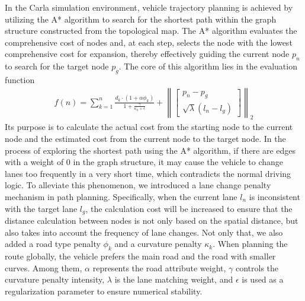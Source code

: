 \documentclass[lettersize,journal]{IEEEtran}
\begin{document}
In the Carla simulation environment, vehicle trajectory planning is achieved by utilizing the A* algorithm to search for the shortest path within the graph structure constructed from the topological map. 
The A* algorithm evaluates the comprehensive cost of nodes and, at each step, selects the node with the lowest comprehensive cost for expansion, thereby effectively guiding the current node \(p_{n}\) to search for the target node \(p_{g}\).
The core of this algorithm lies in the evaluation function 
\begin{align}
	f(n) = \sum_{k = 1}^{n} \frac{d_{k} \cdot\left(1+\alpha \phi_{k}\right)}{1 + \frac{\gamma}{\kappa_k + \epsilon}}+\left\|\left[\begin{array}{c}
		p_{n}-p_{g} \\
		\sqrt{\lambda}\left(l_{n}-l_{g}\right)
	\end{array}\right]\right\|_{2}
\end{align}
Its purpose is to calculate the actual cost from the starting node to the current node and the estimated cost from the current node to the target node. 
In the process of exploring the shortest path using the A* algorithm, if there are edges with a weight of 0 in the graph structure, it may cause the vehicle to change lanes too frequently in a very short time, which contradicts the normal driving logic. 
To alleviate this phenomenon, we introduced a lane change penalty mechanism in path planning. Specifically, when the current lane \(l_{n}\) is inconsistent with the target lane \(l_{g}\), the calculation cost will be increased to ensure that the distance calculation between nodes is not only based on the spatial distance, but also takes into account the frequency of lane changes. Not only that, we also added a road type penalty \(\phi_{k}\) and a curvature penalty \(\kappa_k\). When planning the route globally, the vehicle prefers the main road and the road with smaller curves. 
Among them, \(\alpha\) represents the road attribute weight, \(\gamma\) controls the curvature penalty intensity, \(\lambda\) is the lane matching weight, and \(\epsilon\) is used as a regularization parameter to ensure numerical stability.
\end{document}
